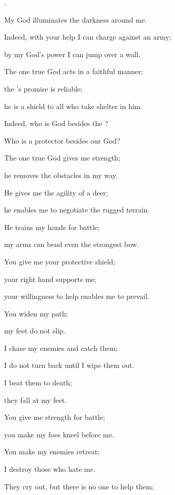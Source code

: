 {{}.

\par }{\Q My God
illuminates
the darkness around me.
\par }{\Q {}Indeed,
with your help I can charge against an army;
\par }{\Q by my God’s
power I can jump over
a wall.
\par }{\Q {}The one true God
acts in a faithful manner;
\par }{\Q the
{}’s
promise
is reliable;
\par }{\Q he is
a shield
to all
who take shelter in him.
\par }{\Q {}Indeed,
who
is God
besides
the {}?
\par }{\Q Who
is a protector
besides
our God?
\par }{\Q {}The one true God
gives
me strength;
\par }{\Q he removes
the obstacles
in my way.
\par }{\Q {}He gives me the agility
of a deer;
\par }{\Q he enables me to negotiate
the rugged terrain.
\par }{\Q {}He trains
my hands
for battle;
\par }{\Q my arms can bend
even the strongest
bow.
\par }{\Q {}You give
me your protective
shield;
\par }{\Q your right hand
supports
me;

\par }{\Q your willingness
to help enables me to prevail.
\par }{\Q {}You widen
my path;
\par }{\Q my feet
do not
slip.
\par }{\Q {}I chase
my enemies
and catch
them;
\par }{\Q I do not
turn back
until
I wipe them out.
\par }{\Q {}I beat
them to death;

\par }{\Q they fall
at my feet.
\par }{\Q {}You give
me strength
for battle;
\par }{\Q you make my foes kneel
before me.
\par }{\Q {}You make
my enemies
retreat;
\par }{\Q I destroy
those who hate
me.
\par }{\Q {}They cry out,
but there is no
one to help
them;

}
